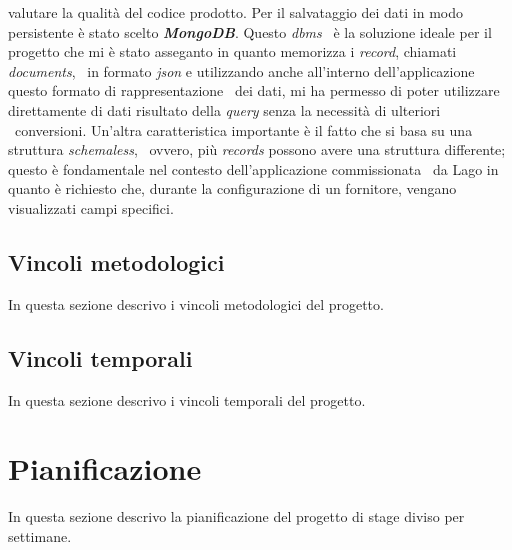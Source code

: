 valutare la qualità del codice prodotto.
Per il salvataggio dei dati in modo persistente è stato scelto \emph{\textbf{MongoDB}}. Questo \emph{\acrshort{dbms}} \
è la soluzione ideale per il progetto che mi è stato asseganto in quanto memorizza i \emph{record}, chiamati \emph{documents}, \
in formato \emph{\acrshort{json}} e utilizzando anche all'interno dell'applicazione questo formato di rappresentazione \
dei dati, mi ha permesso di poter utilizzare direttamente di dati risultato della \emph{query} senza la necessità di ulteriori \
conversioni. Un'altra caratteristica importante è il fatto che si basa su una struttura \emph{schemaless}, \
ovvero, più \emph{records} possono avere una struttura differente; questo è fondamentale nel contesto dell'applicazione commissionata \
da Lago in quanto è richiesto che, durante la configurazione di un fornitore, vengano visualizzati campi specifici.

\subsection{Vincoli metodologici}
In questa sezione descrivo i vincoli metodologici del progetto.

\subsection{Vincoli temporali}
In questa sezione descrivo i vincoli temporali del progetto.

\section{Pianificazione}
In questa sezione descrivo la pianificazione del progetto di stage diviso per settimane.